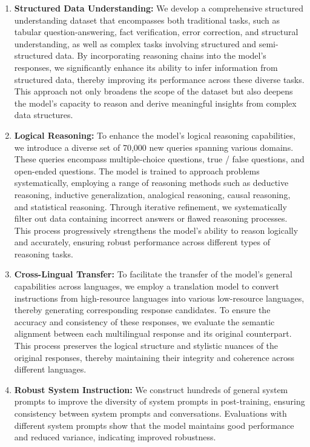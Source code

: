 \documentclass{article}
\begin{document}
\begin{enumerate}[label=(\arabic*)]
    \item \textbf{Structured Data Understanding: } 
    We develop a comprehensive structured understanding dataset that encompasses both traditional tasks, such as tabular question-answering, fact verification, error correction, and structural understanding, as well as complex tasks involving structured and semi-structured data. By incorporating reasoning chains into the model's responses, we significantly enhance its ability to infer information from structured data, thereby improving its performance across these diverse tasks. This approach not only broadens the scope of the dataset but also deepens the model's capacity to reason and derive meaningful insights from complex data structures.

    \item \textbf{Logical Reasoning:} To enhance the model's logical reasoning capabilities, we introduce a diverse set of 70,000 new queries spanning various domains. These queries encompass multiple-choice questions, true / false questions, and open-ended questions. 
    The model is trained to approach problems systematically, employing a range of reasoning methods such as deductive reasoning, inductive generalization, analogical reasoning, causal reasoning, and statistical reasoning. Through iterative refinement, we systematically filter out data containing incorrect answers or flawed reasoning processes. This process progressively strengthens the model's ability to reason logically and accurately, ensuring robust performance across different types of reasoning tasks.
    
    \item \textbf{Cross-Lingual Transfer:} To facilitate the transfer of the model's general capabilities across languages, we employ a translation model to convert instructions from high-resource languages into various low-resource languages, thereby generating corresponding response candidates. To ensure the accuracy and consistency of these responses, we evaluate the semantic alignment between each multilingual response and its original counterpart. This process preserves the logical structure and stylistic nuances of the original responses, thereby maintaining their integrity and coherence across different languages.
    
    \item \textbf{Robust System Instruction:}  We construct hundreds of general system prompts to improve the diversity of system prompts in post-training, ensuring consistency between system prompts and conversations. Evaluations with different system prompts show that the model maintains good performance~\citep{lu2024large} and reduced variance, indicating improved robustness.
    

\end{enumerate}
\end{document}
